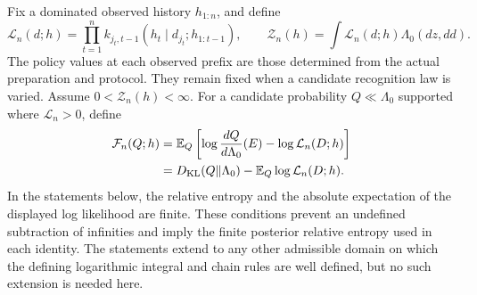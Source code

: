 Fix a dominated observed history $h_{1:n}$, and define
\begin{equation}
 \mathcal L_n(d;h)=\prod_{t=1}^n
 k_{j_t,t-1}(h_t\mid d_{j_t};h_{1:t-1}),\qquad
 \mathcal Z_n(h)=\int\mathcal L_n(d;h)\Lambda_0(dz,dd).
 \label{imem:history-likelihood}
\end{equation}
The policy values at each observed prefix are those determined from the actual preparation and protocol. They remain fixed when a candidate recognition law is varied. Assume $0<\mathcal Z_n(h)<\infty$. For a candidate probability $Q\ll\Lambda_0$ supported where $\mathcal L_n>0$, define
\begin{equation}
 \begin{split}
 \mathcal F_n(Q;h)
 &=\mathbb E_Q\left[
 \log\frac{dQ}{d\Lambda_0}(E)-\log\mathcal L_n(D;h)\right]\\
 &=D_{\mathrm{KL}}(Q\Vert\Lambda_0)-\mathbb E_Q\log\mathcal L_n(D;h).
 \end{split}
 \label{imem:full-free-energy}
\end{equation}
In the statements below, the relative entropy and the absolute expectation of the displayed log likelihood are finite. These conditions prevent an undefined subtraction of infinities and imply the finite posterior relative entropy used in each identity. The statements extend to any other admissible domain on which the defining logarithmic integral and chain rules are well defined, but no such extension is needed here.

